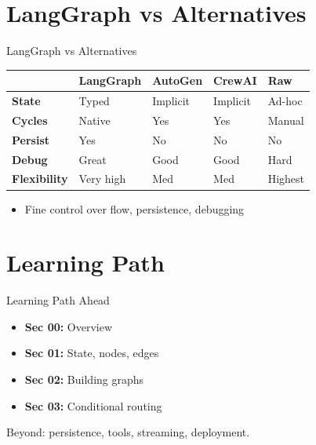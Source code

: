 \documentclass[aspectratio=169,11pt]{beamer}
\begin{document}
\section{LangGraph vs Alternatives}
\begin{frame}[t,shrink=5]{LangGraph vs Alternatives}
\vspace{0.05cm}

{\footnotesize
\begin{tabular}{p{1.6cm}p{2.2cm}p{2.2cm}p{2.2cm}p{2.2cm}}
\toprule
\textbf{} & \textbf{LangGraph} & \textbf{AutoGen} & \textbf{CrewAI} & \textbf{Raw} \\
\midrule
\textbf{State} & Typed & Implicit & Implicit & Ad-hoc \\
\textbf{Cycles} & Native & Yes & Yes & Manual \\
\textbf{Persist} & Yes & No & No & No \\
\textbf{Debug} & Great & Good & Good & Hard \\
\textbf{Flexibility} & Very high & Med & Med & Highest \\
\bottomrule
\end{tabular}
}

\vspace{0.1cm}

\begin{tipbox}
\setlength{\itemsep}{1pt}
{\footnotesize
\begin{itemize}
  \item Fine control over flow, persistence, debugging
\end{itemize}
}
\end{tipbox}
\end{frame}

\section{Learning Path}
\begin{frame}[t,shrink=3]{Learning Path Ahead}
\setlength{\itemsep}{0.5pt}
\vspace{0.05cm}

{\footnotesize
\begin{tipbox}[Sections 00-03]
\setlength{\itemsep}{0.5pt}
\begin{itemize}
  \item \textbf{Sec 00:} Overview
  \item \textbf{Sec 01:} State, nodes, edges
  \item \textbf{Sec 02:} Building graphs
  \item \textbf{Sec 03:} Conditional routing
\end{itemize}
\end{tipbox}

\vspace{0.05cm}

Beyond: persistence, tools, streaming, deployment.
}
\end{frame}
\end{document}
